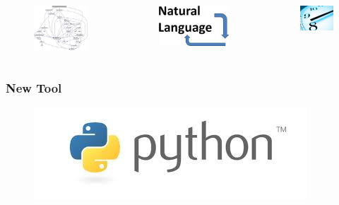 \documentclass[compress=true]{beamer}
\begin{document}
\begin{frame}
\begin{columns}
	\end{columns}
	\begin{columns}
		\begin{column}{0.333\textwidth}
			\begin{figure}
				\includegraphics[height=0.22\textheight]{parser.png}
			\end{figure}
		\end{column}
		\begin{column}{0.334\textwidth}
			\begin{figure}
				\includegraphics[height=0.22\textheight]{nlp.png}
			\end{figure}
		\end{column}
		\begin{column}{0.333\textwidth}
			\begin{figure}
				\includegraphics[height=0.22\textheight]{time.png}
			\end{figure}
		\end{column}
	\end{columns}
\end{frame}
\begin{frame}
	\frametitle{New Tool}
	\begin{figure}
		\includegraphics[height=0.2\textheight]{python_logo.png}
	\end{figure}
\end{frame}
\end{document}
